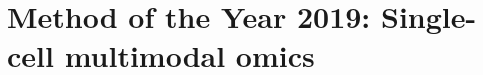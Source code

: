 \documentclass[
]{book}
\begin{document}
\hypertarget{method-of-the-year-2019-single-cell-multimodal-omics}{%
\section{Method of the Year 2019: Single-cell multimodal omics}\label{method-of-the-year-2019-single-cell-multimodal-omics}}

  
\end{document}
